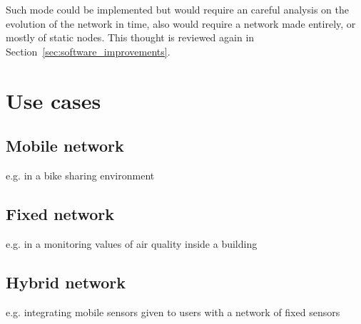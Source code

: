 		Such mode could be implemented but would require an careful analysis on the evolution of the network in time, also would require a network made entirely, or mostly of static nodes.
		This thought is reviewed again in Section~\ref{sec:software_improvements}.
			
	\section{Use cases}
		
		\subsection{Mobile network}
		
			e.g. in a bike sharing environment
		
		\subsection{Fixed network}
		
			e.g. in a monitoring values of air quality inside a building
		
		\subsection{Hybrid network}
		
			e.g. integrating mobile sensors given to users with a network of fixed sensors